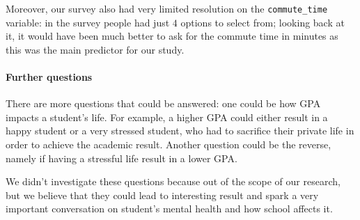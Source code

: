 \documentclass[11pt]{extarticle}
\numberwithin{table}{section}
\numberwithin{figure}{section}
\numberwithin{equation}{section}
\begin{document}
Moreover, our survey also had very limited resolution on the \texttt{commute\_time} variable:
in the survey people had just $4$ options to select from; looking back at it, it would have been
much better to ask for the commute time in minutes as this was the main predictor for our study.

\paragraph{Further questions}
There are more questions that could be answered: one could be how GPA impacts a student’s life.
For example, a higher GPA could either result in a happy student or a very stressed student,
who had to sacrifice their private life in order to achieve the academic result.
Another question could be the reverse, namely if having a stressful life result in a lower GPA.

We didn’t investigate these questions because out of the scope of our research,
but we believe that they could lead to interesting result and spark a very important conversation
on student’s mental health and how school affects it.
\end{document}
